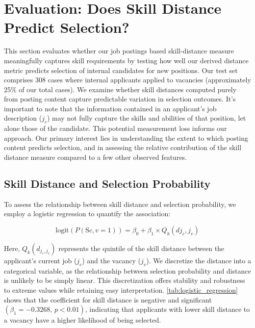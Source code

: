 
\section{Evaluation: Does Skill Distance Predict Selection?}\label{sec:evaluation_skill_distance}

This section evaluates whether our job postings based skill-distance measure meaningfully captures skill requirements by testing how well our derived distance metric predicts 
selection of internal candidates for new positions. Our test set comprises 308 cases where internal applicants applied to vacancies (approximately 25\% of our total cases). 
We examine whether skill distances computed purely from posting content capture predictable variation in selection outcomes. It's important to note that the information 
contained in an applicant's job description ($j_c$) may not fully capture the skills and abilities of that position, let alone those of the candidate. This potential measurement 
loss informs our approach. Our primary interest lies in understanding the extent to which posting content predicts selection, and in assessing the relative contribution of the 
skill distance measure compared to a few other observed features.

\subsection{Skill Distance and Selection Probability}

To assess the relationship between skill distance and selection probability, we employ a logistic regression to quantify the association:

\begin{equation}
\text{logit}(P(\text{S}{c,v} = 1)) = \beta_0 + \beta_1 \times Q_k(d{j_c, j_v})
\end{equation} 

Here, \( Q_k(d_{j_c, j_v}) \) represents the quintile of the skill distance between the applicant's current job (\( j_c \)) and the vacancy (\( j_v \)). We discretize the 
distance into a categorical variable, as the relationship between selection probability and distance is unlikely to be simply linear. This discretization offers stability 
and robustness to extreme values while retaining easy interpretation. \autoref{tab:logistic_regression} shows that the coefficient for skill distance is negative and 
significant \((\beta_1 = -0.3268, \, p < 0.01)\), indicating that applicants with lower skill distance to a vacancy have a higher likelihood of being selected.


